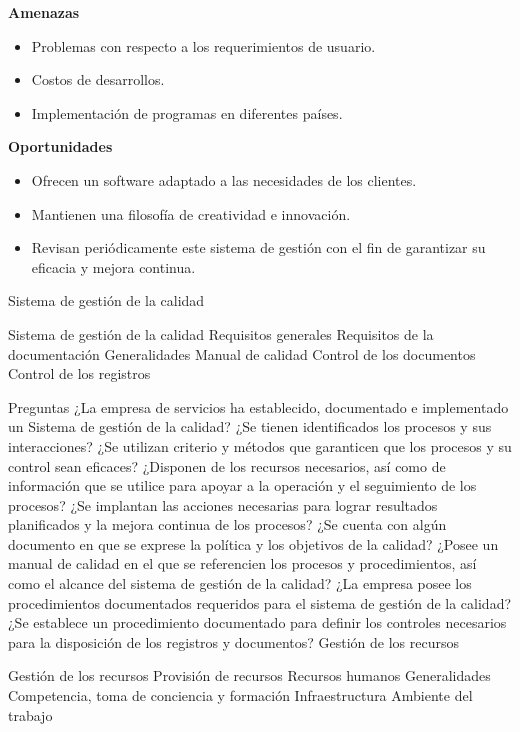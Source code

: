\documentclass[10pt,a4paper]{article}
\begin{document}
\begin{enumerate}
\textbf{Amenazas}

\begin{itemize}
\item Problemas con respecto a los requerimientos de usuario.
\item Costos de desarrollos.
\item Implementación de programas en diferentes países.
\end{itemize}

\textbf{Oportunidades}

\begin{itemize}
\item Ofrecen un software adaptado a las necesidades de los clientes.
\item Mantienen una filosofía de creatividad e innovación. 
\item Revisan periódicamente este sistema de gestión con el fin de garantizar su eficacia y mejora continua.
\end{itemize}


Sistema de gestión de la calidad

Sistema de gestión de la calidad
Requisitos generales
Requisitos de la documentación
Generalidades
Manual de calidad
Control de los documentos
Control de los registros

Preguntas
¿La empresa de servicios ha establecido, documentado e implementado un Sistema de gestión de la calidad? 
¿Se tienen identificados los procesos y sus interacciones?
¿Se utilizan criterio y métodos que garanticen que los procesos y su control sean eficaces?
¿Disponen de los recursos necesarios, así como de información que se utilice para apoyar a la operación y el seguimiento de los procesos?
¿Se implantan las acciones necesarias para lograr resultados planificados y la mejora continua de los procesos? 
¿Se cuenta con algún documento en que se exprese la política y los objetivos de la calidad?
¿Posee un manual de calidad en el que se referencien los procesos y procedimientos, así como el alcance del sistema de gestión de la calidad?
¿La empresa posee los procedimientos documentados requeridos para el sistema de gestión de la calidad?
¿Se establece un procedimiento documentado para definir los controles necesarios para la disposición de los registros y documentos? 
Gestión de los recursos

Gestión de los recursos 
Provisión de recursos
Recursos humanos
Generalidades
Competencia, toma de conciencia y formación
Infraestructura
Ambiente del trabajo


\end{enumerate}
\end{document}
